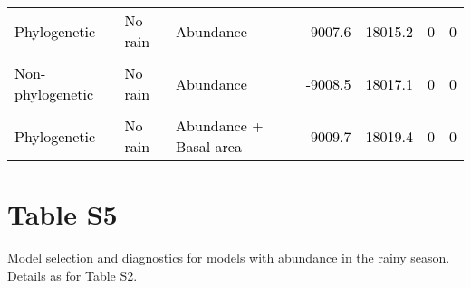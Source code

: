 \documentclass[
  12pt,
  letterpaper,
  DIV=11,
  numbers=noendperiod]{scrartcl}
\begin{document}
\begin{table}[H]
{\begin{tabular}[t]{lllllll}
\textcolor{black}{Phylogenetic} & \textcolor{black}{No rain} & \textcolor{black}{Abundance} & \textcolor{black}{-9007.6} & \textcolor{black}{18015.2} & \textcolor{black}{0} & \textcolor{black}{0}\\
\cellcolor{gray!6}{\textcolor{black}{Non-phylogenetic}} & \cellcolor{gray!6}{\textcolor{black}{No rain}} & \cellcolor{gray!6}{\textcolor{black}{Basal area}} & \cellcolor{gray!6}{\textcolor{black}{-9008.1}} & \cellcolor{gray!6}{\textcolor{black}{18016.3}} & \cellcolor{gray!6}{\textcolor{black}{0}} & \cellcolor{gray!6}{\textcolor{black}{0}}\\
\textcolor{black}{Non-phylogenetic} & \textcolor{black}{No rain} & \textcolor{black}{Abundance} & \textcolor{black}{-9008.5} & \textcolor{black}{18017.1} & \textcolor{black}{0} & \textcolor{black}{0}\\
\cellcolor{gray!6}{\textcolor{black}{Non-phylogenetic}} & \cellcolor{gray!6}{\textcolor{black}{No rain}} & \cellcolor{gray!6}{\textcolor{black}{Abundance + Basal area}} & \cellcolor{gray!6}{\textcolor{black}{-9009.5}} & \cellcolor{gray!6}{\textcolor{black}{18019.0}} & \cellcolor{gray!6}{\textcolor{black}{0}} & \cellcolor{gray!6}{\textcolor{black}{0}}\\
\addlinespace
\textcolor{black}{Phylogenetic} & \textcolor{black}{No rain} & \textcolor{black}{Abundance + Basal area} & \textcolor{black}{-9009.7} & \textcolor{black}{18019.4} & \textcolor{black}{0} & \textcolor{black}{0}\\
\bottomrule
\end{tabular}}
\end{table}

\newpage

\hypertarget{table-s5}{%
\section{Table S5}\label{table-s5}}

Model selection and diagnostics for models with abundance in the rainy
season. Details as for Table S2.
\end{document}

